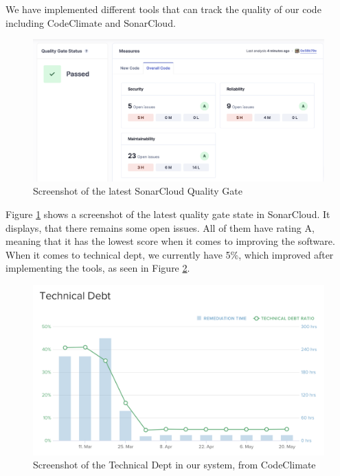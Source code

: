 We have implemented different tools that can track the quality of our code including CodeClimate and SonarCloud.

\begin{figure}[H]
    \centering
    \includegraphics[width=\textwidth]{images/QualityGate.png}
    \caption{Screenshot of the latest SonarCloud Quality Gate}
    \label{img:qualitygate}
\end{figure}

\noindent Figure \ref{img:qualitygate} shows a screenshot of the latest quality gate state in SonarCloud. It displays, that there remains some open issues.  All of them have rating A, meaning that it has the lowest score when it comes to improving the software. \cite{codeclimate} When it comes to technical dept, we currently have 5\%, which improved after implementing the tools, as seen in Figure \ref{img:technical dept}. 

\begin{figure}[H]
    \centering
    \includegraphics[width=\textwidth]{images/Technical Debt.png}
    \caption{Screenshot of the Technical Dept in our system, from CodeClimate}
    \label{img:technical dept}
\end{figure}


